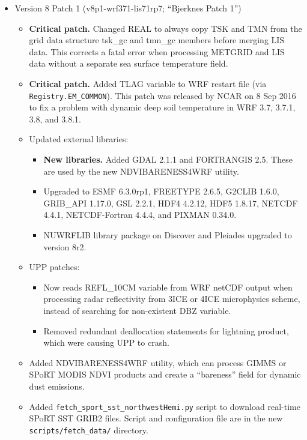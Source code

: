 \begin{itemize}
\item Version 8 Patch 1 (v8p1-wrf371-lis71rp7; ``Bjerknes Patch 1'')
  \begin{itemize}
    \item \textbf{Critical patch.}  Changed REAL to always copy TSK and TMN
      from the grid data structure tsk\_gc and tmn\_gc members before merging
      LIS data.  This corrects a fatal error when processing METGRID and LIS
      data without a separate sea surface temperature field.
    \item \textbf{Critical patch.} Added TLAG variable to WRF restart file
      (via \texttt{Registry.EM\_COMMON}).  This patch was released by NCAR on 
      8 Sep 2016 to fix a problem with dynamic deep soil temperature in WRF 
      3.7, 3.7.1, 3.8, and 3.8.1.
    \item Updated external libraries:
      \begin{itemize}
      \item \textbf{New libraries.}  Added GDAL 2.1.1 and FORTRANGIS 2.5.  
        These are used by the new NDVIBARENESS4WRF utility.
      \item Upgraded to ESMF 6.3.0rp1, FREETYPE 2.6.5, G2CLIB 1.6.0, 
        GRIB\_API 1.17.0, GSL 2.2.1, HDF4 4.2.12, HDF5 1.8.17, NETCDF 4.4.1,
        NETCDF-Fortran 4.4.4, and PIXMAN 0.34.0.
      \item NUWRFLIB library package on Discover and Pleiades upgraded to 
        version 8r2.
      \end{itemize}
    \item UPP patches:
      \begin{itemize}
        \item  Now reads REFL\_10CM variable from WRF netCDF output when
          processing radar reflectivity from 3ICE or 4ICE microphysics scheme,
          instead of searching for non-existent DBZ variable.
        \item Removed redundant deallocation statements for lightning product,
          which were causing UPP to crash.
      \end{itemize}
    \item Added NDVIBARENESS4WRF utility, which can process GIMMS or SPoRT
      MODIS NDVI products and create a ``bareness'' field for dynamic dust
      emissions.
    \item Added \texttt{fetch\_sport\_sst\_northwestHemi.py} script to 
      download real-time SPoRT SST GRIB2 files.  Script and configuration file
      are in the new \texttt{scripts/fetch\_data/} directory.

\end{itemize}
\end{itemize}
